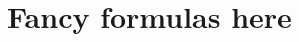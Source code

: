 \documentclass[12pt,a4paper,openright,twoside]{book}
\begin{document}


\section{Fancy formulas here}


\backmatter

\nocite{*} %




\end{document}

